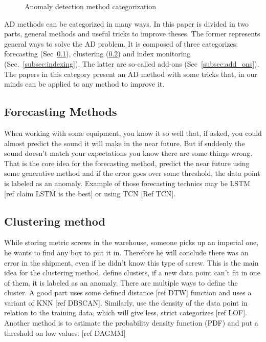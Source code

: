 \documentclass[../../main/main.tex]{subfiles}
\begin{document}
    \begin{figure*}[hp]
        \makebox[\textwidth]{}
        \caption{Anomaly detection method categorization}
    \end{figure*}

    \ac{AD} methods can be categorized in many ways. In this paper is divided in two parts,
    general methods and useful tricks to improve theses. The former represents general ways to 
    solve the \ac{AD} problem. It is composed of three categorizes: forecasting (Sec~\ref{subsec:forecasting}), clustering (\ref{subsec:clustering}) and index monitoring (Sec.~\ref{subsec:indexing}).
    The latter are so-called add-ons (Sec~\ref{subsec:add_ons}). The papers in this category present an \ac{AD} method with some tricks that,
    in our minds can be applied to any method to improve it.
    \subsection{Forecasting Methods}\label{subsec:forecasting}
        When working with some equipment, you know it so well that, if asked, you could almost 
        predict the sound it will make in the near future. But if suddenly the sound doesn't match 
        your expectations you know there are some things wrong.
        That is the core idea for the forecasting method, predict the near future using some generative method
        and if the error goes over some threshold, the data point is labeled as an anomaly. Example of those forecasting technics
        may be \ac{LSTM} [ref claim LSTM is the best] or using \ac{TCN} [Ref TCN].
    
    \subsection{Clustering method}\label{subsec:clustering}
        While storing metric screws in the warehouse, someone picks up an imperial one, he wants to find any box to put it in.
        Therefore he will conclude there was an error in the shipment, even if he didn't know this type of screw. This is the main 
        idea for the clustering method, define clusters, if a new data point can't fit in one of them, it is labeled as an anomaly.
        There are multiple ways to define the cluster. A good part uses some defined distance [ref DTW] function and uses a variant of \ac{KNN}
        [ref DBSCAN]. Similarly, use the density of the data point in relation to the training data, which will 
        give less, strict categorizes [ref LOF]. Another method is to estimate the probability density function (PDF) 
        and put a threshold on low values. [ref DAGMM]
    
\end{document}
